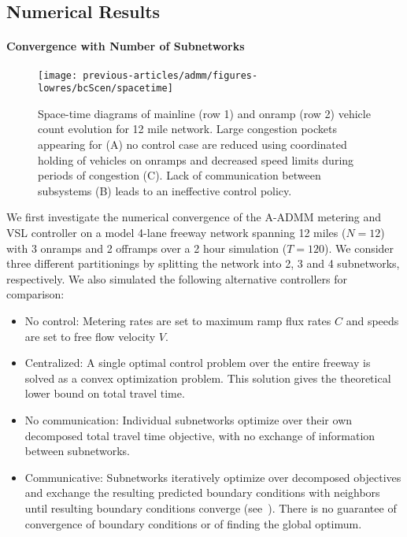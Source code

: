 \subsection{Numerical Results}
\label{sec:numerical_results-admm}

\paragraph{Convergence with Number of Subnetworks}

\begin{figure}[t]
  \centering
  \texttt{[image: previous-articles/admm/figures-lowres/bcScen/spacetime]}
  \caption[Space-time diagrams of mainline and onramp vehicle count evolution for 12 mile network depicting large congestion pockets being reduced using coordinated holding of vehicles on onramps and decreased speed limits during periods of congestion.]{Space-time diagrams of mainline (row 1) and onramp (row 2) vehicle count evolution for 12 mile network. Large congestion pockets appearing for (A) no control case are reduced using coordinated holding of vehicles on onramps and decreased speed limits during periods of congestion (C). Lack of communication between subsystems (B) leads to an ineffective control policy.}
  \label{fig:spacetime}
\end{figure}

We first investigate the numerical convergence of the A-ADMM metering and VSL controller on a model 4-lane freeway network spanning 12 miles ($N=12$) with 3 onramps and 2 offramps over a 2 hour simulation ($T=120$). We consider three different partitionings by splitting the network into 2, 3 and 4 subnetworks, respectively. We also simulated the following alternative controllers for comparison:

\begin{itemize}
  \item No control: Metering rates are set to maximum ramp flux rates $C$ and speeds are set to free flow velocity $V$.
  \item Centralized: A single optimal control problem over the entire freeway is solved as a convex optimization problem. This solution gives the theoretical lower bound on total travel time.
  \item No communication: Individual subnetworks optimize over their own decomposed total travel time objective, with no exchange of information between subnetworks.
  \item Communicative: Subnetworks iteratively optimize over decomposed objectives and exchange the resulting predicted boundary conditions with neighbors until resulting boundary conditions converge (see~\cite{Frejo2011}). There is no guarantee of convergence of boundary conditions or of finding the global optimum.
\end{itemize}

